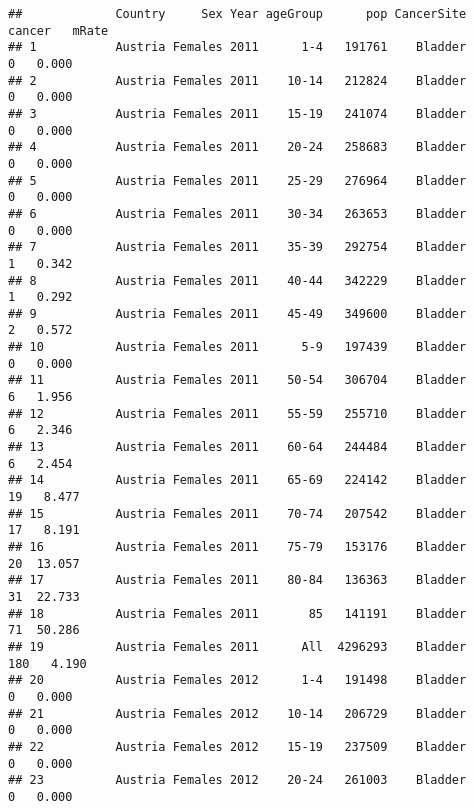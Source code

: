 \documentclass[
]{article}
\newenvironment{Shaded}{\begin{snugshade}}{\end{snugshade}}
\newcommand{\DecValTok}[1]{\textcolor[rgb]{0.00,0.00,0.81}{#1}}
\newcommand{\KeywordTok}[1]{\textcolor[rgb]{0.13,0.29,0.53}{\textbf{#1}}}
\newcommand{\NormalTok}[1]{#1}
\newcommand{\OperatorTok}[1]{\textcolor[rgb]{0.81,0.36,0.00}{\textbf{#1}}}
\newcommand{\StringTok}[1]{\textcolor[rgb]{0.31,0.60,0.02}{#1}}
\begin{document}
\begin{Shaded}
\end{Shaded}

\begin{verbatim}
##             Country     Sex Year ageGroup      pop CancerSite cancer   mRate
## 1           Austria Females 2011      1-4   191761    Bladder      0   0.000
## 2           Austria Females 2011    10-14   212824    Bladder      0   0.000
## 3           Austria Females 2011    15-19   241074    Bladder      0   0.000
## 4           Austria Females 2011    20-24   258683    Bladder      0   0.000
## 5           Austria Females 2011    25-29   276964    Bladder      0   0.000
## 6           Austria Females 2011    30-34   263653    Bladder      0   0.000
## 7           Austria Females 2011    35-39   292754    Bladder      1   0.342
## 8           Austria Females 2011    40-44   342229    Bladder      1   0.292
## 9           Austria Females 2011    45-49   349600    Bladder      2   0.572
## 10          Austria Females 2011      5-9   197439    Bladder      0   0.000
## 11          Austria Females 2011    50-54   306704    Bladder      6   1.956
## 12          Austria Females 2011    55-59   255710    Bladder      6   2.346
## 13          Austria Females 2011    60-64   244484    Bladder      6   2.454
## 14          Austria Females 2011    65-69   224142    Bladder     19   8.477
## 15          Austria Females 2011    70-74   207542    Bladder     17   8.191
## 16          Austria Females 2011    75-79   153176    Bladder     20  13.057
## 17          Austria Females 2011    80-84   136363    Bladder     31  22.733
## 18          Austria Females 2011       85   141191    Bladder     71  50.286
## 19          Austria Females 2011      All  4296293    Bladder    180   4.190
## 20          Austria Females 2012      1-4   191498    Bladder      0   0.000
## 21          Austria Females 2012    10-14   206729    Bladder      0   0.000
## 22          Austria Females 2012    15-19   237509    Bladder      0   0.000
## 23          Austria Females 2012    20-24   261003    Bladder      0   0.000

\end{verbatim}
\end{document}
